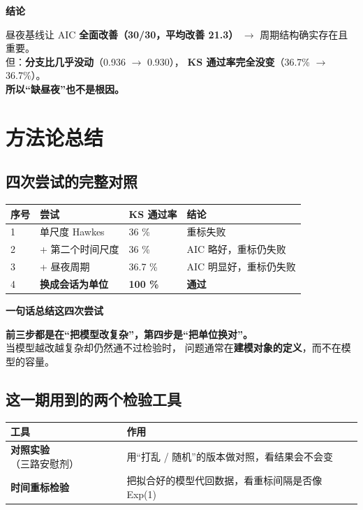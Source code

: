 \documentclass[UTF8,a4paper,11pt]{ctexart}
\newenvironment{explainbox}[1]
{\begin{center}\begin{minipage}{0.94\textwidth}\colorbox{boxbg}{\parbox{0.92\textwidth}{\textbf{#1}\par\vspace{2pt}}}}
{\end{minipage}\end{center}}
\newcommand{\hl}[1]{\textcolor{blue!70!black}{\textbf{#1}}}
\begin{document}
\begin{explainbox}{结论}
昼夜基线让 AIC \textbf{全面改善（30/30，平均改善 21.3）}
$\to$ 周期结构确实存在且重要。\\
但：\textbf{分支比几乎没动}（0.936 $\to$ 0.930），
\textbf{KS 通过率完全没变}（36.7\% $\to$ 36.7\%）。\\[4pt]
\textbf{所以“缺昼夜”也不是根因。}
\end{explainbox}

\newpage

\section{方法论总结}

\subsection{四次尝试的完整对照}

\begin{longtable}{@{}p{1.0cm}p{4.6cm}p{3.0cm}p{6.4cm}@{}}
\toprule
\textbf{序号} & \textbf{尝试} & \textbf{KS 通过率} & \textbf{结论} \\
\midrule
1 & 单尺度 Hawkes & 36 \% & 重标失败 \\
2 & + 第二个时间尺度 & 36 \% & AIC 略好，重标仍失败 \\
3 & + 昼夜周期 & 36.7 \% & AIC 明显好，重标仍失败 \\
4 & \textbf{换成会话为单位} & \hl{\textbf{100 \%}} & \hl{\textbf{通过}} \\
\bottomrule
\end{longtable}

\begin{explainbox}{一句话总结这四次尝试}
\textbf{前三步都是在“把模型改复杂”，第四步是“把单位换对”。}\\[4pt]
当模型越改越复杂却仍然通不过检验时，
问题通常在\hl{建模对象的定义}，而不在模型的容量。
\end{explainbox}

\subsection{这一期用到的两个检验工具}

\begin{longtable}{@{}p{4.2cm}p{9.6cm}@{}}
\toprule
\textbf{工具} & \textbf{作用} \\
\midrule
\textbf{对照实验}（三路安慰剂） & 用“打乱 / 随机”的版本做对照，看结果会不会变 \\
\textbf{时间重标检验} & 把拟合好的模型代回数据，看重标间隔是否像 Exp(1) \\
\bottomrule
\end{longtable}
\end{document}
